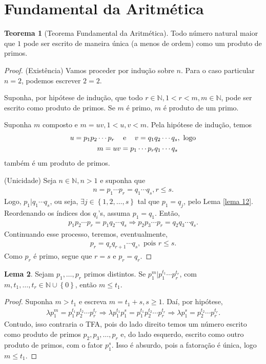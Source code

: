 \documentclass[a4paper,11pt,twoside, leqno]{article}
\theoremstyle{definition}
\newtheorem{theorem}{Teorema}[section]
\newtheorem{lemma}[theorem]{Lema}
\begin{document}
\section{Fundamental da Aritmética}
\begin{theorem}[Teorema Fundamental da Aritmética]
	Todo número natural maior que $1$ pode ser escrito de maneira única (a menos de ordem) como um produto de primos.
\end{theorem}
\begin{proof}
	(Existência) Vamos proceder por indução sobre $n$. Para o caso particular $n=2$, podemos escrever $2=2$.
	
	Suponha, por hipótese de indução, que todo $r\in\mathbb{N}, 1 < r < m, m\in\mathbb{N}$, pode ser escrito como produto de primos. Se $m$ é primo, $m$ é produto de um primo.
	
	Suponha $m$ composto e $m = uv, 1 < u,v < m$. Pela hipótese de indução, temos
	\begin{align*}
	u = p_1p_2\cdots p_r \hspace{0.3cm} &\text{ e } \hspace{0.3cm} v = q_1q_2\cdots q_s, \text{ logo} \\
	m = uv &= p_1\cdots p_rq_1\cdots q_s
	\end{align*} 
	também é um produto de primos.
	
	(Unicidade) Seja $n\in\mathbb{N}, n>1$ e suponha que
	\begin{align*}
	n = p_1\cdots p_r = q_1\cdots q_s, r\leq s.
	\end{align*}
	Logo, $p_1|q_1\cdots q_s$, ou seja, $\exists j\in\left\{ 1, 2, \dots, s \right\}$ tal que $p_1 = q_j$, pelo Lema \eqref{lema 12}. Reordenando os índices dos $q_i$'s, assuma $p_1 = q_1$. Então,
	\begin{align*}
	p_1p_2\cdots p_r = p_1q_2\cdots q_s \Rightarrow p_2p_3\cdots p_r = q_2q_3\cdots q_s.
	\end{align*}
	Continuando esse processo, teremos, eventualmente,
	\begin{align*}
	p_r = q_rq_{r+1}\cdots q_s, \text{ pois }r\leq s.
	\end{align*}
	Como $p_r$ é primo, segue que $r=s$ e $p_r=q_r$.
\end{proof}
\begin{lemma}
	\label{lema 14}
	Sejam $p_1, \dots, p_r$ primos distintos. Se $p_1^m|p_1^{t_1}\cdots p_r^{t_r}$, com $m, t_1, \dots, t_r\in\mathbb{N}\cup\left\{0\right\}$, então $m\leq t_1$.
\end{lemma}
\begin{proof}
	Suponha $m>t_1$ e escreva $m = t_1 + s, s\geq 1$. Daí, por hipótese, 
	\begin{align*}
	\lambda p_1^m = p_1^{t_1}p_2^{t_2}\cdots p_r^{t_r} \Longrightarrow \lambda p_1^{t_1}p_1^s = p_1^{t_1}p_2^{t_2}\cdots p_r^{t_r} \Longrightarrow \lambda p_1^s = p_2^{t_2}\cdots p_r^{t_r}.
	\end{align*}
	Contudo, isso contraria o TFA, pois do lado direito temos um número escrito como produto de primos $p_2, p_3, \dots, p_r$ e, do lado esquerdo, escrito como outro produto de primos, com o fator $p_1^s$. Isso é absurdo, pois a fatoração é única, logo $m\leq t_1$. 
\end{proof}
\end{document}
